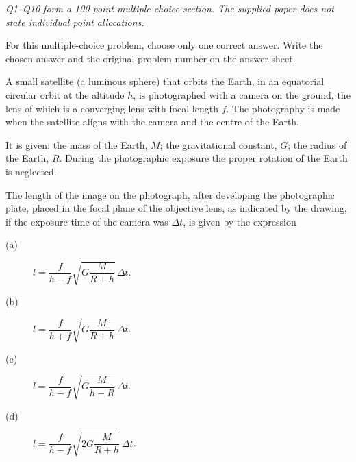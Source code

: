 \textit{Q1--Q10 form a 100-point multiple-choice section. The supplied paper
does not state individual point allocations.}

For this multiple-choice problem, choose only one correct answer. Write the
chosen answer and the original problem number on the answer sheet.

A small satellite (a luminous sphere) that orbits the Earth, in an equatorial
circular orbit at the altitude $h$, is photographed with a camera on the
ground, the lens of which is a converging lens with focal length $f$.
The photography is made when the satellite aligns with the camera and the
centre of the Earth.

It is given: the mass of the Earth, $M$; the gravitational constant, $G$;
the radius of the Earth, $R$. During the photographic exposure the proper
rotation of the Earth is neglected.

The length of the image on the photograph, after developing the photographic
plate, placed in the focal plane of the objective lens, as indicated by the
drawing, if the exposure time of the camera was $\Delta t$, is given by the
expression
\begin{description}
\item[(a)] $l=\dfrac{f}{h-f}\sqrt{G\dfrac{M}{R+h}}\,\Delta t$.
\item[(b)] $l=\dfrac{f}{h+f}\sqrt{G\dfrac{M}{R+h}}\,\Delta t$.
\item[(c)] $l=\dfrac{f}{h-f}\sqrt{G\dfrac{M}{h-R}}\,\Delta t$.
\item[(d)] $l=\dfrac{f}{h-f}\sqrt{2G\dfrac{M}{R+h}}\,\Delta t$.
\end{description}
